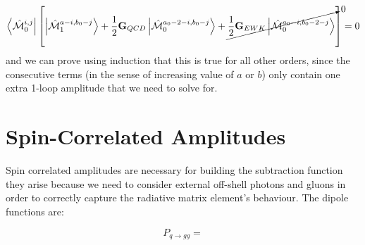 \documentclass[a4paper]{article}
\def \Int#1{\int d#1 \hskip0.1cm}
\def \MBra#1#2#3{\left<\hat{\mathcal{M}}_{#1}^{#2,#3}\right|}
\def \MKet#1#2#3{\left|\hat{\mathcal{M}}_{#1}^{#2,#3}\right>}
\begin{document}
\begin{equation}
 \MBra{0}{i}{j}
 \left[
 \MKet{1}{a-i}{b_0-j}
 +
 \frac{1}{2}\textbf{G}_{QCD}\MKet{0}{a_0-2-i}{b_0-j}
 +
 \cancelto{0}{\frac{1}{2}\textbf{G}_{EWK}\MKet{0}{a_0-i}{b_0-2-j}}
 \right]=0
\end{equation}
and we can prove using induction that this is true for all other orders, since the consecutive terms (in the sense of increasing value of $a$ or $b$) only contain one extra 1-loop amplitude that we need to solve for.


% 



\newpage
\section{Spin-Correlated Amplitudes}
Spin correlated amplitudes are necessary for building the subtraction function they arise because 
we need to consider external off-shell photons and gluons in order to correctly capture the 
radiative matrix element's behaviour. The dipole functions are:

\begin{equation}
 P_{q\rightarrow gg} = 
\end{equation}
\end{document}
